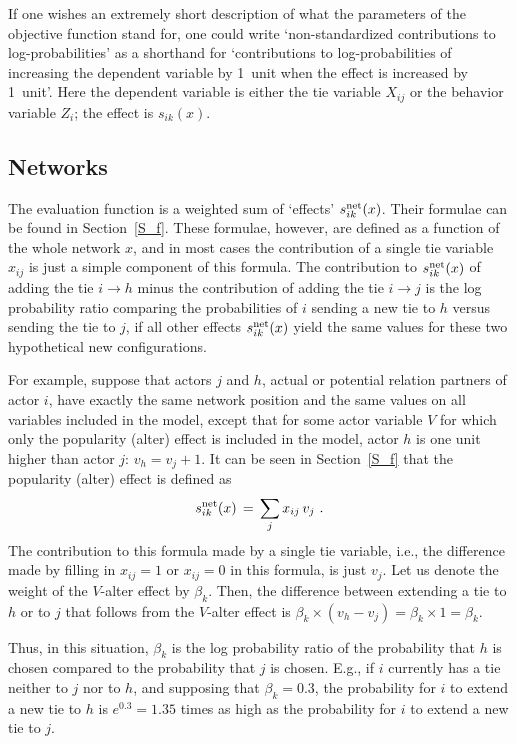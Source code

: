 \documentclass[a4paper,fleqn,11pt]{article}
\newcommand{\+}{\, + \,}
\begin{document}
If one wishes an extremely short description of what the parameters
of the objective function stand for, one could write
`non-standardized contributions to log-probabilities'
as a shorthand for
`contributions to log-probabilities of increasing the
dependent variable by 1~unit when the effect is increased by 1~unit'.
Here the dependent variable is either the tie variable $X_{ij}$
or the behavior variable $Z_i$; the effect is $s_{ik}(x)$.



\subsection{Networks}

The evaluation function is a weighted sum of `effects'
$s^{\rm net}_{ik}(x)$.
Their formulae can be found in Section~\ref{S_f}.
These formulae, however, are defined as a function of the whole
network $x$, and in most cases the contribution of a single tie
variable $x_{ij}$ is just a simple component of this formula.
The contribution to $s^{\rm net}_{ik}(x)$
of adding the tie $i \rightarrow h$ minus the
contribution of adding the tie $i \rightarrow j$ is the log probability ratio
comparing the probabilities of $i$ sending a new tie to $h$ versus
sending the tie to $j$, if all other effects $s^{\rm net}_{ik}(x)$
yield the same values for these two hypothetical new configurations.

For example, suppose that actors $j$ and $h$,
actual or potential relation partners of actor $i$,
have exactly the same network
position and the same values on all variables included in the model,
except that for some actor variable $V$ for which only the
popularity (alter) effect is included in the model,
actor $h$ is one unit higher than actor $j$: $v_h = v_j + 1$.
It can be seen in Section~\ref{S_f} that
the popularity (alter) effect is defined as
\[
s^{\rm net}_{ik}(x) \, = \,  \sum_j x_{ij}\, v_j \ .
\]
The contribution to this formula made by a single tie variable,
i.e., the difference made by filling in $x_{ij} = 1$ or $x_{ij} = 0$
in this formula, is just $v_j$.
Let us denote the weight of the $V$-alter effect by $\beta_k$.
Then, the difference between extending a tie to $h$ or to $j$
that follows from the $V$-alter effect is
$\beta_k \times (v_h - v_j) = \beta_k \times 1 = \beta_k$.

Thus, in this situation, $\beta_k$ is the log probability ratio of the probability
that $h$ is chosen compared to the probability that $j$ is chosen.
E.g., if $i$ currently has a tie neither to $j$ nor to $h$,
and supposing that $\beta_k = 0.3$, the probability for $i$ to
extend a new tie to $h$ is $e^{0.3} = 1.35$ times as high
as the probability for $i$ to extend a new tie to $j$.
\end{document}
